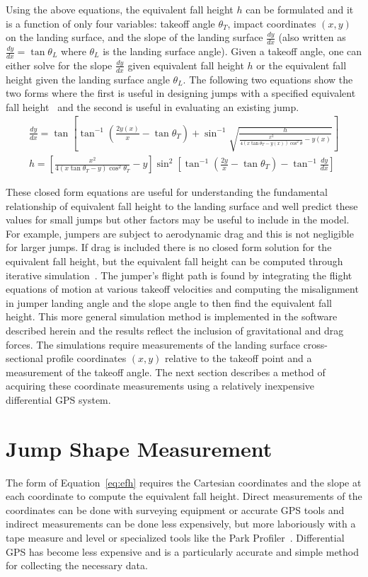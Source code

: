 \documentclass{article}
\begin{document}
Using the above equations, the equivalent fall height $h$ can be formulated and
it is a function of only four variables: takeoff angle $\theta_T$, impact
coordinates $(x, y)$ on the landing surface, and the slope of the landing
surface $\frac{dy}{dx}$ (also written as $\frac{dy}{dx}=\tan\theta_L$ where
$\theta_L$ is the landing surface angle). Given a takeoff angle, one can either
solve for the slope $\frac{dy}{dx}$ given equivalent fall height $h$ or the
equivalent fall height given the landing surface angle $\theta_L$. The
following two equations show the two forms where the first is useful in
designing jumps with a specified equivalent fall height~\cite{Levy2015} and the
second is useful in evaluating an existing jump.
%
\begin{align}
  \frac{dy}{dx} = \tan\left[\tan^{-1}\left(\frac{2y(x)}{x} - \tan\theta_T\right) +
    \sin^{-1}\sqrt{\frac{h}{\frac{x^2}{4(x\tan\theta_T -
    y(x))\cos^{2}\theta} - y(x)}}\right] \\
  h = \left[\frac{x^2}{4(x\tan\theta_T - y)\cos^{2}\theta_T} -
    y\right]\sin^{2}\left[\tan^{-1}\left(\frac{2y}{x}- \tan\theta_T\right) - \tan^{-1}\frac{dy}{dx}\right]
  \label{eq:efh}
\end{align}

These closed form equations are useful for understanding the fundamental
relationship of equivalent fall height to the landing surface and well predict
these values for small jumps but other factors may be useful to include in the
model. For example, jumpers are subject to aerodynamic drag and this is not
negligible for larger jumps. If drag is included there is no closed form
solution for the equivalent fall height, but the equivalent fall height can be
computed through iterative simulation~\cite{Levy2015}. The jumper's flight path
is found by integrating the flight equations of motion at various takeoff
velocities and computing the misalignment in jumper landing angle and the slope
angle to then find the equivalent fall height. This more general simulation
method is implemented in the software described herein and the results reflect
the inclusion of gravitational and drag forces. The simulations require
measurements of the landing surface cross-sectional profile coordinates $(x,y)$
relative to the takeoff point and a measurement of the takeoff angle. The next
section describes a method of acquiring these coordinate measurements using a
relatively inexpensive differential GPS system.

\section{Jump Shape Measurement}
%
The form of Equation~\ref{eq:efh} requires the Cartesian coordinates and the
slope at each coordinate to compute the equivalent fall height. Direct
measurements of the coordinates can be done with surveying equipment or
accurate GPS tools and indirect measurements can be done less expensively, but
more laboriously with a tape measure and level or specialized tools like the
Park Profiler~. Differential GPS has become less expensive
and is a particularly accurate and simple method for collecting the necessary
data.
\end{document}

